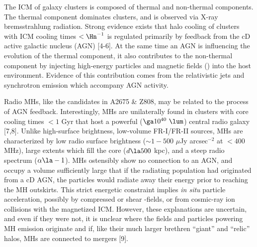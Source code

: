\documentclass[letterpaper,11pt]{article}
\begin{document}
 The ICM of galaxy clusters
is composed of thermal and non-thermal components. The thermal
component dominates clusters, and is observed via X-ray bremsstrahlung
radiation. Strong evidence exists that halo cooling of clusters with
ICM cooling times $< \Hn^{-1}$ is regulated primarily by feedback from
the cD active galactic nucleus (AGN) [4-6]. At the same time an AGN is
influencing the evolution of the thermal component, it also
contributes to the non-thermal component by injecting high-energy
particles and magnetic fields (\bmag) into the host
environment. Evidence of this contribution comes from the relativistic
jets and synchrotron emission which accompany AGN activity.

Radio MHs, like the candidates in A2675 \& Z808, may be related to the
process of AGN feedback. Interestingly, MHs are unilaterally found in
clusters with core cooling times $< 1$ Gyr that host a powerful ($\ga
10^{40} ~\lum$) central radio galaxy [7,8]. Unlike high-surface
brightness, low-volume FR-I/FR-II sources, MHs are characterized by
low radio surface brightness ($\sim 1-500$ $\mu$Jy arcsec$^{-2}$ at $<
400$ MHz), large extents which fill the core ($d \la 500$ kpc), and a
steep radio spectrum ($\alpha \la -1$). MHs ostensibly show no
connection to an AGN, and occupy a volume sufficiently large that if
the radiating population had originated from a cD AGN, the particles
would radiate away their energy prior to reaching the MH
outskirts. This strict energetic constraint implies {\it{in situ}}
particle acceleration, possibly by compressed or shear \bmag-fields,
or from cosmic-ray ion collisions with the magnetized ICM. However,
these explanations are uncertain, and even if they were not, it is
unclear where the fields and particles powering MH emission originate
and if, like their much larger brethren ``giant'' and ``relic'' halos,
MHs are connected to mergers [9].
\end{document}
